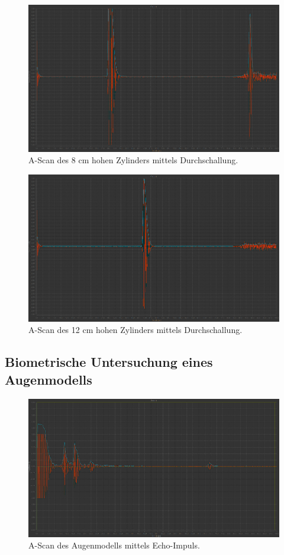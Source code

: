     \begin{figure}
        \centering
        \includegraphics[width=15cm]{messwerte/Durchschallung/8_Durch.png}
        \caption{A-Scan des 8 cm hohen Zylinders mittels Durchschallung.}
    \end{figure}

    \begin{figure}
        \centering
        \includegraphics[width=15cm]{messwerte/Durchschallung/12_Durch.png}
        \caption{A-Scan des 12 cm hohen Zylinders mittels Durchschallung.}
    \end{figure}

\subsection{Biometrische Untersuchung eines Augenmodells}

    \begin{figure}
        \centering
        \includegraphics[width=15cm]{messwerte/Durchschallung/Auge.png}
        \caption{A-Scan des Augenmodells mittels Echo-Impuls.}
    \end{figure}